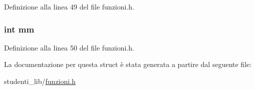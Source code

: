 Definizione alla linea 49 del file funzioni.\+h.

\hypertarget{structdata_a34c26acca324499b464752be283dc36f}{
\subsubsection[{mm}]{\setlength{\rightskip}{0pt plus 5cm}int mm}}\label{structdata_a34c26acca324499b464752be283dc36f}


Definizione alla linea 50 del file funzioni.\+h.



La documentazione per questa struct è stata generata a partire dal seguente file\+:\begin{DoxyCompactItemize}
\item 
studenti\+\_\+lib/\hyperlink{funzioni_8h}{funzioni.\+h}\end{DoxyCompactItemize}
